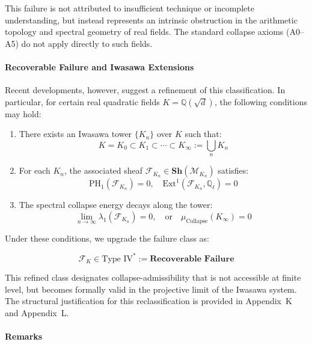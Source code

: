 \documentclass[11pt]{article}
\begin{document}
This failure is not attributed to insufficient technique or incomplete understanding, but instead represents an intrinsic obstruction in the arithmetic topology and spectral geometry of real fields. The standard collapse axioms (A0–A5) do not apply directly to such fields.

\medskip

\paragraph{Recoverable Failure and Iwasawa Extensions}

Recent developments, however, suggest a refinement of this classification. In particular, for certain real quadratic fields \( K = \mathbb{Q}(\sqrt{d}) \), the following conditions may hold:

\begin{enumerate}
  \item There exists an Iwasawa tower \( \{ K_n \} \) over \( K \) such that:
  \[
  K = K_0 \subset K_1 \subset \cdots \subset K_\infty := \bigcup_{n} K_n
  \]
  \item For each \( K_n \), the associated sheaf \( \mathcal{F}_{K_n} \in \mathbf{Sh}(\mathcal{M}_{K_n}) \) satisfies:
  \[
  \mathrm{PH}_1(\mathcal{F}_{K_n}) = 0,\quad \mathrm{Ext}^1(\mathcal{F}_{K_n}, \mathbb{Q}_\ell) = 0
  \]
  \item The spectral collapse energy decays along the tower:
  \[
  \lim_{n \to \infty} \lambda_1(\mathcal{F}_{K_n}) = 0, \quad \text{or} \quad \mu_{\mathrm{Collapse}}(K_\infty) = 0
  \]
\end{enumerate}

Under these conditions, we upgrade the failure class as:

\begin{equation}
\mathcal{F}_K \in \text{Type IV}^{\ast} := \textbf{Recoverable Failure}
\end{equation}

This refined class designates collapse-admissibility that is not accessible at finite level, but becomes formally valid in the projective limit of the Iwasawa system. The structural justification for this reclassification is provided in Appendix~K and Appendix~L.

\medskip

\paragraph{Remarks}
\end{document}
